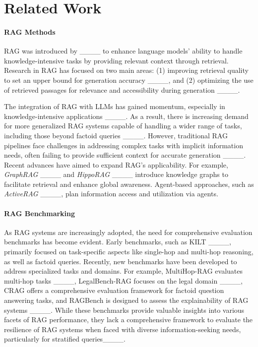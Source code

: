 \section{Related Work}
\paragraph{RAG Methods}  
RAG was introduced by ____ to enhance language models' ability to handle knowledge-intensive tasks by providing relevant context through retrieval. Research in RAG has focused on two main areas: (1) improving retrieval quality to set an upper bound for generation accuracy ____, and (2) optimizing the use of retrieved passages for relevance and accessibility during generation ____.  

The integration of RAG with LLMs has gained momentum, especially in knowledge-intensive applications ____. As a result, there is increasing demand for more generalized RAG systems capable of handling a wider range of tasks, including those beyond factoid queries ____. However, traditional RAG pipelines face challenges in addressing complex tasks with implicit information needs, often failing to provide sufficient context for accurate generation ____.  
Recent advances have aimed to expand RAG’s applicability. For example, \textit{GraphRAG} ____ and \textit{HippoRAG} ____ introduce knowledge graphs to facilitate retrieval and enhance global awareness. Agent-based approaches, such as \textit{ActiveRAG} ____, plan information access and utilization via agents. 


\paragraph{RAG Benchmarking}  
As RAG systems are increasingly adopted, the need for comprehensive evaluation benchmarks has become evident. Early benchmarks, such as KILT ____, primarily focused on task-specific aspects like single-hop and multi-hop reasoning, as well as factoid queries. Recently, new benchmarks have been developed to address specialized tasks and domains. For example, MultiHop-RAG evaluates multi-hop tasks ____, LegalBench-RAG focuses on the legal domain ____, CRAG offers a comprehensive evaluation framework for factoid question answering tasks, and RAGBench is designed to assess the explainability of RAG systems ____. While these benchmarks provide valuable insights into various facets of RAG performance, they lack a comprehensive framework to evaluate the resilience of RAG systems when faced with diverse information-seeking needs, particularly for stratified queries____.
